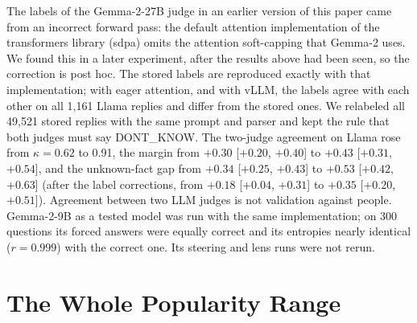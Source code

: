 \documentclass[letterpaper]{article} %
\begin{document}
The labels of the Gemma-2-27B judge in an earlier version of this paper came from an incorrect forward pass: the default attention implementation of the transformers library (sdpa) omits the attention soft-capping that Gemma-2 uses. We found this in a later experiment, after the results above had been seen, so the correction is post hoc. The stored labels are reproduced exactly with that implementation; with eager attention, and with vLLM, the labels agree with each other on all 1,161 Llama replies and differ from the stored ones. We relabeled all 49,521 stored replies with the same prompt and parser and kept the rule that both judges must say DONT\_KNOW. The two-judge agreement on Llama rose from $\kappa = 0.62$ to 0.91, the margin from $+0.30$ [$+0.20$, $+0.40$] to $+0.43$ [$+0.31$, $+0.54$], and the unknown-fact gap from $+0.34$ [$+0.25$, $+0.43$] to $+0.53$ [$+0.42$, $+0.63$] (after the label corrections, from $+0.18$ [$+0.04$, $+0.31$] to $+0.35$ [$+0.20$, $+0.51$]). Agreement between two LLM judges is not validation against people. Gemma-2-9B as a tested model was run with the same implementation; on 300 questions its forced answers were equally correct and its entropies nearly identical ($r = 0.999$) with the correct one. Its steering and lens runs were not rerun.

\section{The Whole Popularity Range}
\label{app:range}
\end{document}

